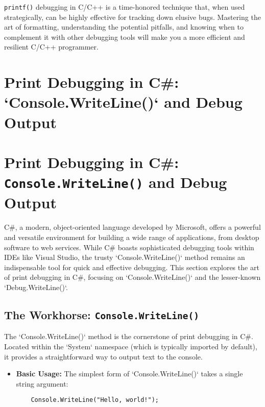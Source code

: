 \documentclass{article}
\begin{document}
{{{{\texttt{printf()} debugging in C/C++ is a time-honored technique that, when used strategically, can be highly effective for tracking down elusive bugs. Mastering the art of formatting, understanding the potential pitfalls, and knowing when to complement it with other debugging tools will make you a more efficient and resilient C/C++ programmer.

\newpage

\section*{Print Debugging in C#: `Console.WriteLine()` and Debug Output} %
\label{chapter-9-5-Print_Debugging_in_C____Console.WriteLin}

\section*{Print Debugging in C\#: \texttt{Console.WriteLine()} and Debug Output}

C\#, a modern, object-oriented language developed by Microsoft, offers a powerful and versatile environment for building a wide range of applications, from desktop software to web services. While C\# boasts sophisticated debugging tools within IDEs like Visual Studio, the trusty `Console.WriteLine()` method remains an indispensable tool for quick and effective debugging. This section explores the art of print debugging in C#, focusing on `Console.WriteLine()` and the lesser-known `Debug.WriteLine()`.

\subsection*{The Workhorse: \texttt{Console.WriteLine()}}

The `Console.WriteLine()` method is the cornerstone of print debugging in C#. Located within the `System` namespace (which is typically imported by default), it provides a straightforward way to output text to the console.

\begin{itemize}
    \item \textbf{Basic Usage:} The simplest form of `Console.WriteLine()` takes a single string argument:

    \begin{verbatim}
    Console.WriteLine("Hello, world!");
    \end{verbatim}


\end{itemize}}}}}
\end{document}
